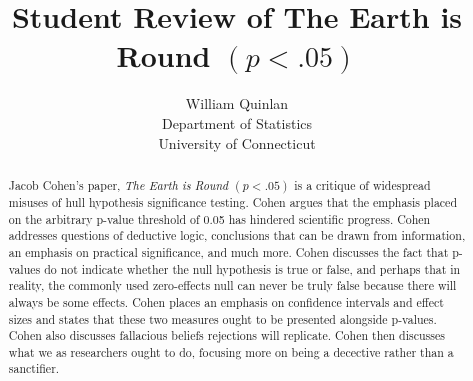 \documentclass[12pt]{article}
\title{Student Review of The Earth is Round $(p < .05)$}
\author{William Quinlan\\
  Department of Statistics\\
  University of Connecticut
}
\begin{document}
\maketitle

\begin{abstract}
Jacob Cohen's paper, \textit{The Earth is Round $(p < .05)$} is a critique of widespread misuses of hull hypothesis significance testing. Cohen argues that the emphasis placed on the arbitrary p-value threshold of 0.05 has hindered scientific progress. Cohen addresses questions of deductive logic, conclusions that can be drawn from information, an emphasis on practical significance, and much more. Cohen discusses the fact that p-values do not indicate whether the null hypothesis is true or false, and perhaps that in reality, the commonly used zero-effects null can never be truly false because there will always be some effects. Cohen places an emphasis on confidence intervals and effect sizes and states that these two measures ought to be presented alongside p-values. Cohen also discusses fallacious beliefs rejections will replicate. Cohen then discusses what we as researchers ought to do, focusing more on being a decective rather than a sanctifier. 

\end{abstract}

\doublespacing




\end{document}

